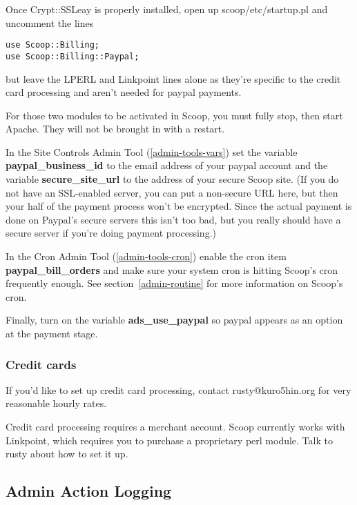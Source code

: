 Once Crypt::SSLeay is properly installed, open up scoop/etc/startup.pl and uncomment the lines
\begin{verbatim}
use Scoop::Billing;
use Scoop::Billing::Paypal;
\end{verbatim}
but leave the LPERL and Linkpoint lines alone as they're specific to the credit card processing and aren't needed for paypal payments.

For those two modules to be activated in Scoop, you must fully stop, then start Apache. They will not be brought in with a restart.

In the Site Controls Admin Tool (\ref{admin-tools-vars}) set the variable {\bf paypal\_business\_id} to the email address of your paypal account and the variable {\bf secure\_site\_url} to the address of your secure Scoop site. (If you do not have an SSL-enabled server, you can put a non-secure URL here, but then your half of the payment process won't be encrypted. Since the actual payment is done on Paypal's secure servers this isn't too bad, but you really should have a secure server if you're doing payment processing.)

In the Cron Admin Tool (\ref{admin-tools-cron}) enable the cron item {\bf paypal\_bill\_orders} and make sure your system cron is hitting Scoop's cron frequently enough. See section~\ref{admin-routine} for more information on Scoop's cron.

Finally, turn on the variable {\bf ads\_use\_paypal} so paypal appears as an option at the payment stage.


\subsubsection{Credit cards}

If you'd like to set up credit card processing, contact rusty@kuro5hin.org for very reasonable hourly rates.

Credit card processing requires a merchant account. Scoop currently works with Linkpoint, which requires you to purchase a proprietary perl module. Talk to rusty about how to set it up.

\subsection{Admin Action Logging}
\label{features-admin-action-log}

